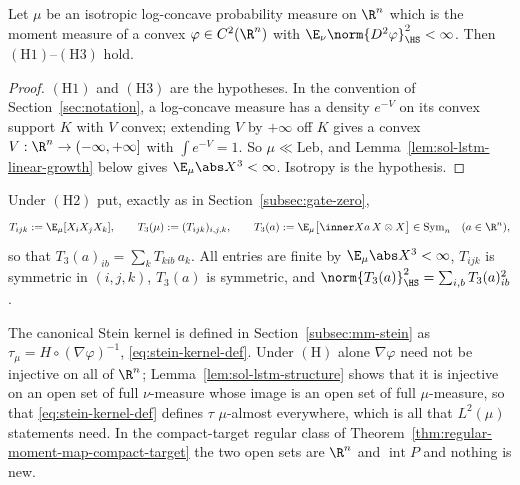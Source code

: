 \documentclass[../main.tex]{subfiles}
\begin{document}
\begin{lemma}
\label{lem:sol-lstm-logconcave}
Let $\mu$ be an isotropic log-concave probability measure on $\R^n$ which is the moment
measure of a convex $\varphi\in C^2(\R^n)$ with $\E_\nu\norm{D^2\varphi}_{\HS}^2<\infty$.
Then $(\mathrm H1)$--$(\mathrm H3)$ hold.
\end{lemma}

\begin{proof}
$(\mathrm H1)$ and $(\mathrm H3)$ are the hypotheses.  In the convention of
Section~\ref{sec:notation}, a log-concave measure has a density $e^{-V}$ on its convex support
$K$ with $V$ convex; extending $V$ by $+\infty$ off $K$ gives a convex
$V:\R^n\to(-\infty,+\infty]$ with $\int e^{-V}=1$.  So $\mu\ll\mathrm{Leb}$, and
Lemma~\ref{lem:sol-lstm-linear-growth} below gives $\E_\mu\abs X^3<\infty$.  Isotropy is
the hypothesis.
\end{proof}

\begin{definition}
\label{def:sol-lstm-T3}
Under $(\mathrm H2)$ put, exactly as in Section~\ref{subsec:gate-zero},
\[
  T_{ijk}:=\E_\mu[X_iX_jX_k],\qquad T_3(\mu):=(T_{ijk})_{i,j,k},\qquad
  T_3(a):=\E_\mu\bigl[\inner Xa\,X\otimes X\bigr]\in\mathrm{Sym}_n\quad(a\in\R^n),
\]
so that $T_3(a)_{ib}=\sum_kT_{kib}\,a_k$.  All entries are finite by
$\E_\mu\abs X^3<\infty$, $T_{ijk}$ is symmetric in $(i,j,k)$, $T_3(a)$ is symmetric, and
$\norm{T_3(a)}_{\HS}^2=\sum_{i,b}T_3(a)_{ib}^2$.
\end{definition}

The canonical Stein kernel is defined in Section~\ref{subsec:mm-stein} as
$\tau_\mu=H\circ(\nabla\varphi)^{-1}$, \eqref{eq:stein-kernel-def}.  Under $(\mathrm H)$
alone $\nabla\varphi$ need not be injective on all of $\R^n$; Lemma~\ref{lem:sol-lstm-structure}
shows that it is injective on an open set of full $\nu$-measure whose image is an open set of
full $\mu$-measure, so that \eqref{eq:stein-kernel-def} defines $\tau$ $\mu$-almost
everywhere, which is all that $L^2(\mu)$ statements need.  In the compact-target regular
class of Theorem~\ref{thm:regular-moment-map-compact-target} the two open sets are $\R^n$ and
$\operatorname{int}P$ and nothing is new.
\end{document}
